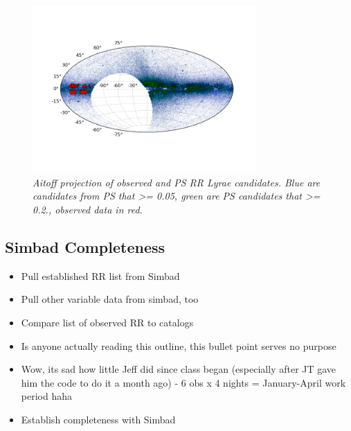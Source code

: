 \documentclass[aps,prl,twocolumn,superscriptaddress]{revtex4-1}
\begin{document}
\begin{figure}[H]
 \centering
 \includegraphics[width=3.35in]{figures/aitoff/Obs_PS_lsum_aitoff_map.png}
 \caption{\it \small{Aitoff projection of observed and PS RR Lyrae candidates.  Blue are candidates from PS that >= 0.05, green are PS candidates that >= 0.2., observed data in red.}}%
 \label{fig:aitoff_nosimbad}
\end{figure}

\subsection{Simbad Completeness}
\begin{itemize}
	\item{} Pull established RR list from Simbad
	\item{} Pull other variable data from simbad, too
	\item{} Compare list of observed RR to catalogs
	\item{} Is anyone actually reading this outline, this bullet point serves no purpose
	\item{} Wow, its sad how little Jeff did since class began (especially after JT gave him the code to do it a month ago) - 6 obs x 4 nights = January-April work period haha
	\item{} Establish completeness with Simbad
\end{itemize}
\end{document}
